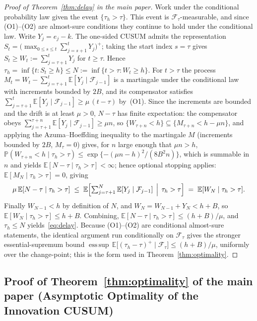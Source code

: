 \documentclass[bj,authoryear]{imsart}
\theoremstyle{plain}
\theoremstyle{definition}
\newcommand{\E}{\mathbb{E}}
\newcommand{\Prob}{\mathbb{P}}
\newcommand{\F}{\mathcal{F}}
\newcommand{\given}{\mid}
\begin{document}
\begin{proof}[Proof of Theorem~\ref{thm:delay} in the main paper]
  Work under the conditional probability law given the event
  $\{\tau_h>\tau\}$.  This event is $\F_\tau$-measurable, and since
  (O1)--(O2) are almost-sure conditions they continue to hold under the
  conditional law.  Write $Y_j=\hat e_j-k$.
  The one-sided CUSUM admits the representation
  $S_t=\bigl(\max_{0\leq s\leq t}\sum_{j=s+1}^t Y_j\bigr)^+$; taking the
  start index $s=\tau$ gives
  $S_t\geq W_t:=\sum_{j=\tau+1}^t Y_j$ for $t\geq\tau$.  Hence
  $\tau_h=\inf\{t:S_t\geq h\}\leq
  N:=\inf\{t>\tau:W_t\geq h\}$.
  For $t>\tau$ the process
  $M_t=W_t-\sum_{j=\tau+1}^t\E[Y_j\given\F_{j-1}]$ is a martingale under the
  conditional law with increments bounded by $2B$, and its compensator
  satisfies
  $\sum_{j=\tau+1}^t\E[Y_j\given\F_{j-1}]\geq\mu\,(t-\tau)$ by~(O1).
  Since the increments are bounded and the drift is at least $\mu>0$,
  $N-\tau$ has finite expectation: the compensator obeys
  $\sum_{j=\tau+1}^{\tau+n}\E[Y_j\given\F_{j-1}]\geq\mu n$, so
  $\{W_{\tau+n}<h\}\subseteq\{M_{\tau+n}<h-\mu n\}$, and applying the
  Azuma--Hoeffding inequality to the martingale $M$ (increments bounded by
  $2B$, $M_\tau=0$) gives, for $n$ large enough that $\mu n>h$,
  $\Prob(W_{\tau+n}<h\mid\tau_h>\tau)\leq
  \exp\{-(\mu n-h)^2/(8B^2n)\}$, which
  is summable in $n$ and yields $\E[N-\tau\mid\tau_h>\tau]<\infty$; hence
  optional stopping applies:
  $\E[M_N\mid\tau_h>\tau]=0$, giving
  \[
    \mu\,\E[N-\tau\mid\tau_h>\tau]
    \;\leq\;
    \E\Bigl[\textstyle\sum_{j=\tau+1}^N
      \E[Y_j\given\F_{j-1}]\,\Bigm|\,\tau_h>\tau\Bigr]
    \;=\; \E[W_N\mid\tau_h>\tau].
  \]
  Finally $W_{N-1}<h$ by definition of $N$, and
  $W_N=W_{N-1}+Y_N<h+B$, so
  $\E[W_N\mid\tau_h>\tau]\leq h+B$.  Combining,
  $\E[N-\tau\mid\tau_h>\tau]\leq(h+B)/\mu$, and $\tau_h\leq N$
  yields~\eqref{eq:delay}.
  Because (O1)--(O2) are conditional almost-sure statements, the identical
  argument run conditionally on $\F_\tau$ gives the stronger
  essential-supremum bound
  $\operatorname*{ess\,sup}\,\E\bigl[(\tau_h-\tau)^+\mid\F_\tau\bigr]\leq(h+B)/\mu$,
  uniformly over the change-point; this is the form used in
  Theorem~\ref{thm:optimality}.
\end{proof}

\subsection{Proof of Theorem~\ref{thm:optimality} of the main paper (Asymptotic Optimality of the Innovation CUSUM)}
\label{app:proof-optimality}
\end{document}
